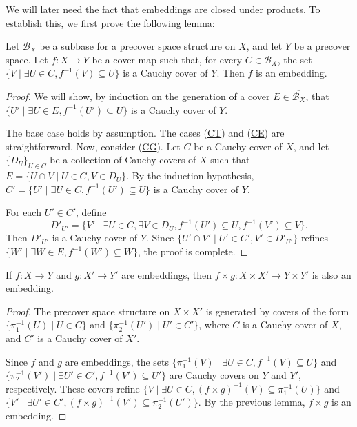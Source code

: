 \documentclass[reqno]{amsart}
\newcommand{\axref}[1]{(\hyperref[ax:#1]{#1})}
\theoremstyle{definition}
\theoremstyle{remark}
\numberwithin{figure}{section}
\begin{document}
We will later need the fact that embeddings are closed under products.
To establish this, we first prove the following lemma:

\begin{lem}
Let $\mathcal{B}_X$ be a subbase for a precover space structure on $X$, and let $Y$ be a precover space.
Let $f : X \to Y$ be a cover map such that, for every $C \in \mathcal{B}_X$, the set $\{ V \mid \exists U \in C, f^{-1}(V) \subseteq U \}$ is a Cauchy cover of $Y$.
Then $f$ is an embedding.
\end{lem}
\begin{proof}
We will show, by induction on the generation of a cover $E \in \overline{\mathcal{B}_X}$, that $\{ U' \mid \exists U \in E, f^{-1}(U') \subseteq U \}$ is a Cauchy cover of $Y$.

The base case holds by assumption.
The cases \axref{CT} and \axref{CE} are straightforward.
Now, consider \axref{CG}.
Let $C$ be a Cauchy cover of $X$, and let $\{ D_U \}_{U \in C}$ be a collection of Cauchy covers of $X$ such that $E = \{ U \cap V \mid U \in C, V \in D_U \}$.
By the induction hypothesis, $C' = \{ U' \mid \exists U \in C, f^{-1}(U') \subseteq U \}$ is a Cauchy cover of $Y$.

For each $U' \in C'$, define
\[ D'_{U'} = \{ V' \mid \exists U \in C, \exists V \in D_U, f^{-1}(U') \subseteq U, f^{-1}(V') \subseteq V \}. \]
Then $D'_{U'}$ is a Cauchy cover of $Y$.
Since $\{ U' \cap V' \mid U' \in C', V' \in D'_{U'} \}$ refines $\{ W' \mid \exists W \in E, f^{-1}(W') \subseteq W \}$, the proof is complete.
\end{proof}

\begin{lem}
If $f : X \to Y$ and $g : X' \to Y'$ are embeddings, then $f \times g : X \times X' \to Y \times Y'$ is also an embedding.
\end{lem}
\begin{proof}
The precover space structure on $X \times X'$ is generated by covers of the form $\{ \pi_1^{-1}(U) \mid U \in C \}$ and $\{ \pi_2^{-1}(U') \mid U' \in C' \}$,
where $C$ is a Cauchy cover of $X$, and $C'$ is a Cauchy cover of $X'$.

Since $f$ and $g$ are embeddings, the sets $\{ \pi_1^{-1}(V) \mid \exists U \in C, f^{-1}(V) \subseteq U \}$
and $\{ \pi_2^{-1}(V') \mid \exists U' \in C', f^{-1}(V') \subseteq U' \}$ are Cauchy covers on $Y$ and $Y'$, respectively.
These covers refine $\{ V \mid \exists U \in C, (f \times g)^{-1}(V) \subseteq \pi_1^{-1}(U) \}$
and $\{ V' \mid \exists U' \in C', (f \times g)^{-1}(V') \subseteq \pi_2^{-1}(U') \}$.
By the previous lemma, $f \times g$ is an embedding.
\end{proof}
\end{document}
